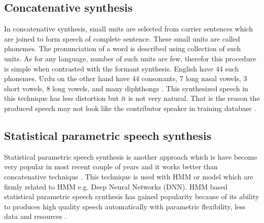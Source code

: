 \subsection{Concatenative synthesis}
In concatenative synthesis, small units are selected from carrier sentences which are joined to form speech of complete sentence. These small units are called phonemes. The pronunciation of a word is described using collection of such units. As for any language, number of such units are few, therefor this procedure is simple when contrasted with the formant synthesis. English have 44 such phonemes. Urdu on the other hand have 44 consonants, 7 long nasal vowels, 3 short vowels, 8 long vowels, and many diphthongs \cite{saleem2002urdu}. This synthesized speech in this technique has less distortion but it is not very natural. That is the reason the produced speech may not look like the contributor speaker in training database \cite{huang1996whistler}.

\subsection{Statistical parametric speech synthesis}
Statistical parametric speech synthesis is another approach which is have become very popular in most recent couple of years and it works better than concatenative technique \cite{merritt2013investigating}. This technique is used with HMM or model which are firmly related to HMM e.g. Deep Neural Networks (DNN). HMM based statistical parametric speech synthesis has gained popularity because of its ability to produces high quality speech automatically with parametric flexibility, less data and resources \cite{black2007statistical}.


